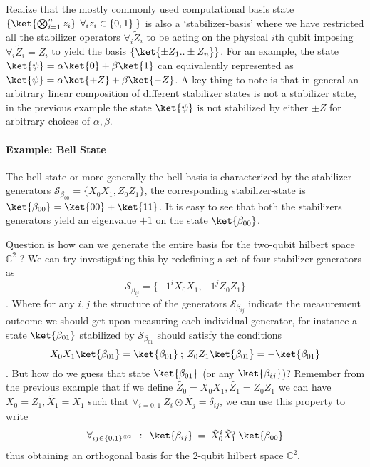 \documentclass[
]{article}
\begin{document}
Realize that the mostly commonly used computational basis state
\(\{ \ket{\bigotimes_{i=1}^{n} z_{i}} \:\: \forall_{i}z_{i} \in \{0,1\} \: \}\)
is also a `stabilizer-basis' where we have restricted all the stabilizer
operators \(\forall_{i} \tilde{Z}_{i}\) to be acting on the physical
\(i\)th qubit imposing \(\forall_{i} \tilde{Z}_{i} = Z_{i}\) to yield
the basis \(\{\ket{\pm Z_{1}.. \pm Z_n}\}\). For an example, the state
\(\ket{\psi} = \alpha \ket{0} + \beta \ket{1}\) can equivalently
represented as \(\ket{\psi} = \alpha \ket{+Z} + \beta \ket{-Z}\). A key
thing to note is that in general an arbitrary linear composition of
different stabilizer states is not a stabilizer state, in the previous
example the state \(\ket{\psi}\) is not stabilized by either \(\pm Z\)
for arbitrary choices of \(\alpha, \beta\).

\hypertarget{example-bell-state}{%
\paragraph{Example: Bell State}\label{example-bell-state}}

The bell state or more generally the bell basis is characterized by the
stabilizer generators
\(\mathcal{S}_{\beta_{00}}= \{X_{0}X_{1}, Z_{0}Z_{1} \}\), the
corresponding stabilizer-state is
\(\ket{\beta_{00}} = \ket{00} + \ket{11}\). It is easy to see that both
the stabilizers generators yield an eigenvalue \(+1\) on the state
\(\ket{\beta_{00}}\).

Question is how can we generate the entire basis for the two-qubit
hilbert space \(\mathbb{C}^2\) ? We can try investigating this by
redefining a set of four stabilizer generators as
\[\mathcal{S}_{\beta_{ij}} = \{ -1^{i}X_{0}X_{1},-1^{j} Z_{0}Z_{1} \} \].
Where for any \(i,j\) the structure of the generators
\(\mathcal{S}_{\beta_{ij}}\) indicate the measurement outcome we should
get upon measuring each individual generator, for instance a state
\(\ket{\beta_{01}}\) stabilized by \(\mathcal{S}_{\beta_{01}}\) should
satisfy the conditions
\[X_0X_{1}\ket{\beta_{01}}= \ket{\beta_{01}} \:; \: Z_0Z_{1}\ket{\beta_{01}}= -\ket{\beta_{01}}\].
But how do we guess that state \(\ket{\beta_{01}}\) (or any
\(\ket{\beta_{ij}}\))? Remember from the previous example that if we
define \(\tilde{Z_{0}}=X_0X_{1} , \tilde{Z_{1}}= Z_{0}Z_{1}\) we can
have \(\tilde{X_{0}}=Z_{1}, \tilde{X_{1}}=X_1\) such that
\(\forall_{i=0,1} \: \tilde{Z_{i}} \odot \tilde{X_{j}} = \delta_{ij}\),
we can use this property to write
\[\forall_{ij \in \{0,1\}^{\otimes 2}} \:\:: \:\: \ket{\beta_{ij}}  \: = \: \tilde{X}_{0}^{i} \tilde{X}_{1}^{j} \:\ket{\beta_{00}}\]
thus obtaining an orthogonal basis for the 2-qubit hilbert space
\(\mathbb{C}^2\).
\end{document}
